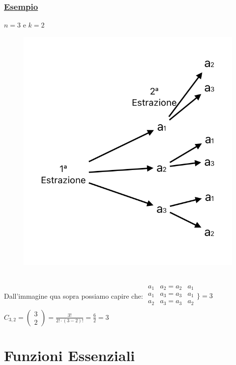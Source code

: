 \documentclass{article}
\begin{document}
\subsubsection{\underline{Esempio}}
$n=3$ e $k=2$ \\
\begin{figure}[ht]
\centering
\includegraphics[scale=0.4]{5.Comb.png}
\end{figure} \\
Dall'immagine qua sopra possiamo capire che: $\begin{matrix}
a_1 & a_2 = a_2 & a_1 \\
a_1 & a_3 = a_3 & a_1 \\
a_2 & a_3 = a_3 & a_2 \\
\end{matrix} 
\Biggr\}
=3$ \\
$C_{3,2} = \left( \begin{matrix} 3 \\ 2 \end{matrix} \right) =  \frac{3!}{2! \cdot (3-2)!} = \frac{6}{2} = 3$
\section{Funzioni Essenziali}
\end{document}
